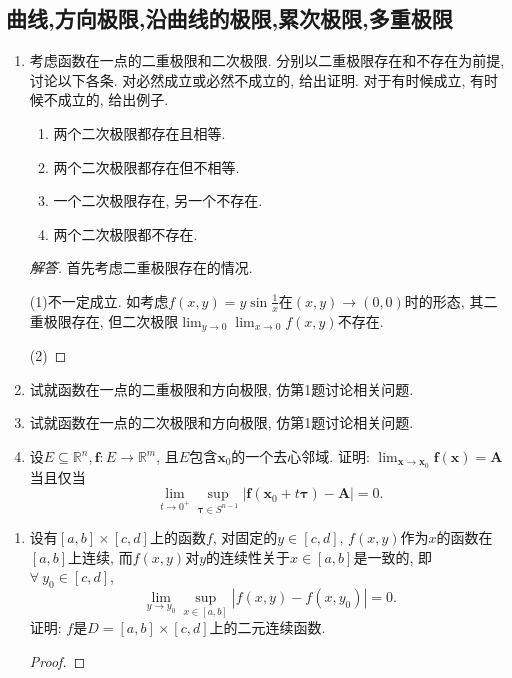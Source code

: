 \subsection{曲线,方向极限,沿曲线的极限,累次极限,多重极限}
\begin{4a}
\begin{enumerate}
\item 考虑函数在一点的二重极限和二次极限. 分别以二重极限存在和不存在为前提, 讨论以下各条. 
对必然成立或必然不成立的, 给出证明. 对于有时候成立, 有时候不成立的, 给出例子.
\begin{enumerate}[label=(\arabic*)]
\item 两个二次极限都存在且相等.
\item 两个二次极限都存在但不相等.
\item 一个二次极限存在, 另一个不存在.
\item 两个二次极限都不存在.
\end{enumerate}
\begin{proof}[解答]
首先考虑二重极限存在的情况.

(1)不一定成立. 如考虑\(f(x,y)=y\sin\frac{1}{x}\)在\((x,y)\rightarrow(0,0)\)时的形态, 其二重极限存在, 但二次极限\(\lim_{y\rightarrow 0}\lim_{x\rightarrow 0}f(x,y)\)不存在.

(2)
\end{proof}
\item 试就函数在一点的二重极限和方向极限, 仿第1题讨论相关问题.
\item 试就函数在一点的二次极限和方向极限, 仿第1题讨论相关问题.
\item 设\(E\subseteq\mathbb{R}^n,\boldsymbol{f}:E\rightarrow\mathbb{R}^m\), 
且\(E\)包含\(\boldsymbol{x}_0\)的一个去心邻域. 
证明: \(\lim_{\boldsymbol{x}\rightarrow\boldsymbol{x}_0}\boldsymbol{f}(\boldsymbol{x})=\boldsymbol{A}\)当且仅当
\[\lim_{t\rightarrow0^+}\sup_{\boldsymbol{\tau}\in S^{n-1}}\left|\boldsymbol{f}(\boldsymbol{x}_0+t\boldsymbol{\tau})-\boldsymbol{A}\right|=0.\]
\end{enumerate}
\end{4a}
\begin{4b}
\begin{enumerate}
\item 设有\([a,b]\times[c,d]\)上的函数\(f\), 
对固定的\(y\in[c,d],\,f(x,y)\)作为\(x\)的函数在\([a,b]\)上连续, 
而\(f(x,y)\)对\(y\)的连续性关于\(x\in [a,b]\)是一致的, 即\(\forall\ y_0\in[c,d]\),
\[\lim_{y\rightarrow y_0}\sup_{x\in [a,b]}\left|f(x,y)-f(x,y_0)\right|=0.\]证明: \(f\)是\(D=[a,b]\times [c,d]\)上的二元连续函数.
\begin{proof}
	
\end{proof}
\end{enumerate}
\end{4b}